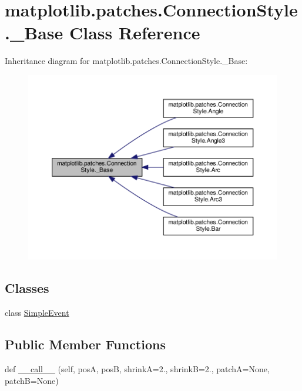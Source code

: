 \hypertarget{classmatplotlib_1_1patches_1_1ConnectionStyle_1_1__Base}{}\section{matplotlib.\+patches.\+Connection\+Style.\+\_\+\+Base Class Reference}
\label{classmatplotlib_1_1patches_1_1ConnectionStyle_1_1__Base}


Inheritance diagram for matplotlib.\+patches.\+Connection\+Style.\+\_\+\+Base\+:
\nopagebreak
\begin{figure}[H]
\begin{center}
\leavevmode
\includegraphics[width=350pt]{classmatplotlib_1_1patches_1_1ConnectionStyle_1_1__Base__inherit__graph}
\end{center}
\end{figure}
\subsection*{Classes}
\begin{DoxyCompactItemize}
\item 
class \hyperlink{classmatplotlib_1_1patches_1_1ConnectionStyle_1_1__Base_1_1SimpleEvent}{Simple\+Event}
\end{DoxyCompactItemize}
\subsection*{Public Member Functions}
\begin{DoxyCompactItemize}
\item 
def \hyperlink{classmatplotlib_1_1patches_1_1ConnectionStyle_1_1__Base_ad7d3bfb980597e9c0a651c28549f7a82}{\+\_\+\+\_\+call\+\_\+\+\_\+} (self, posA, posB, shrinkA=2., shrinkB=2., patchA=None, patchB=None)
\end{DoxyCompactItemize}


